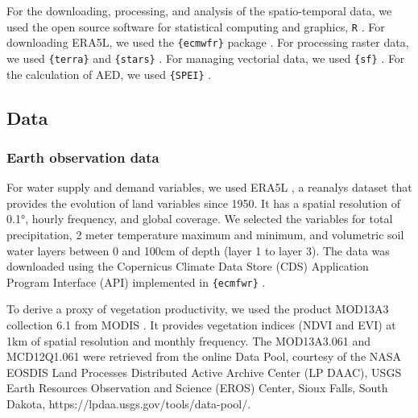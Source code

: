 \documentclass[
  authoryear,
  preprint,
  3p,
  onecolumn]{elsarticle}
\begin{document}
For the downloading, processing, and analysis of the spatio-temporal
data, we used the open source software for statistical computing and
graphics, \texttt{R} \citep{R2023}. For downloading ERA5L, we used the
\texttt{\{ecmwfr\}} package \citep{Hufkens2019}. For processing raster
data, we used \texttt{\{terra\}} \citep{Hijmans2023} and
\texttt{\{stars\}} \citep{Pebesma2023}. For managing vectorial data, we
used \texttt{\{sf\}} \citep{Pebesma2018}. For the calculation of AED, we
used \texttt{\{SPEI\}} \citep{Bergueria2023}.

\hypertarget{data}{%
\subsection{Data}\label{data}}

\hypertarget{earth-observation-data}{%
\subsubsection{Earth observation data}\label{earth-observation-data}}

For water supply and demand variables, we used ERA5L
\citep{MunozSabater2021}, a reanalys dataset that provides the evolution
of land variables since 1950. It has a spatial resolution of 0.1°,
hourly frequency, and global coverage. We selected the variables for
total precipitation, 2 meter temperature maximum and minimum, and
volumetric soil water layers between 0 and 100cm of depth (layer 1 to
layer 3). The data was downloaded using the Copernicus Climate Data
Store (CDS) Application Program Interface (API) implemented in
\texttt{\{ecmfwr\}} \citep{Hufkens2019}.

To derive a proxy of vegetation productivity, we used the product
MOD13A3 collection 6.1 from MODIS \citep{Didan2015}. It provides
vegetation indices (NDVI and EVI) at 1km of spatial resolution and
monthly frequency. The MOD13A3.061 and MCD12Q1.061 were retrieved from
the online Data Pool, courtesy of the NASA EOSDIS Land Processes
Distributed Active Archive Center (LP DAAC), USGS Earth Resources
Observation and Science (EROS) Center, Sioux Falls, South Dakota,
https://lpdaa.usgs.gov/tools/data-pool/.
\end{document}
